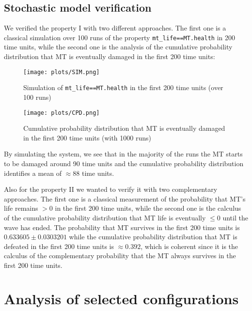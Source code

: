 \documentclass[
10pt, %
a4paper, %
oneside, %
headinclude,footinclude, %
BCOR5mm, %
]{scrartcl}
\begin{document}
		\subsection{Stochastic model verification}
			We verified the property I with two different approaches. The first one is a classical simulation over 100 runs of the property \texttt{mt\_life==MT.health} in 200 time units, while the second one is the analysis of the cumulative probability distribution that MT is eventually damaged in the first 200 time units:
			\begin{figure}[H]
				\centering
				\begin{minipage}{.45\textwidth}
					\centering
					\texttt{[image: plots/SIM.png]}
					\caption{Simulation of \texttt{mt\_life==MT.health} in the first 200 time units (over 100 runs)}
				\end{minipage}
				\begin{minipage}{.45\textwidth}
					\centering
					\texttt{[image: plots/CPD.png]}
					\caption{Cumulative probability distribution that MT is eventually damaged in the first 200 time units (with 1000 runs)}
				\end{minipage}
			\end{figure}
			By simulating the system, we see that in the majority of the runs the MT starts to be damaged around 90 time units and the cumulative probability distribution identifies a mean of $\approx88$ time units.
			
			Also for the property II we wanted to verify it with two complementary approaches. The first one is a classical measurement of the probability that MT's life remains $>0$ in the first 200 time units, while the second one is the calculus of the cumulative probability distribution that MT life is eventually $\leq0$ until the wave has ended. The probability that MT survives in the first 200 time units is $0.633605\pm 0.0303201$ while the cumulative probability distribution that MT is defeated in the first 200 time units is $\approx 0.392$, which is coherent since it is the calculus of the complementary probability that the MT always survives in the first 200 time units.
			
	\section{Analysis of selected configurations}
\end{document}
